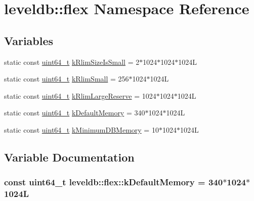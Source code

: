 \hypertarget{namespaceleveldb_1_1flex}{}\section{leveldb\+:\+:flex Namespace Reference}
\label{namespaceleveldb_1_1flex}
\subsection*{Variables}
\begin{DoxyCompactItemize}
\item 
static const \hyperlink{stdint_8h_aaa5d1cd013383c889537491c3cfd9aad}{uint64\+\_\+t} \hyperlink{namespaceleveldb_1_1flex_af09b08660faa7ab237dcb9aa82bc5bab}{k\+Rlim\+Size\+Is\+Small} = 2$\ast$1024$\ast$1024$\ast$1024\+L
\item 
static const \hyperlink{stdint_8h_aaa5d1cd013383c889537491c3cfd9aad}{uint64\+\_\+t} \hyperlink{namespaceleveldb_1_1flex_a5fe4e3d0496afe8a7e9902a7819ec9fa}{k\+Rlim\+Small} = 256$\ast$1024$\ast$1024\+L
\item 
static const \hyperlink{stdint_8h_aaa5d1cd013383c889537491c3cfd9aad}{uint64\+\_\+t} \hyperlink{namespaceleveldb_1_1flex_aa93b23239803953fdb50d685ae6c07cc}{k\+Rlim\+Large\+Reserve} = 1024$\ast$1024$\ast$1024\+L
\item 
static const \hyperlink{stdint_8h_aaa5d1cd013383c889537491c3cfd9aad}{uint64\+\_\+t} \hyperlink{namespaceleveldb_1_1flex_a300deb1bb8fec8c95157943a943ce7a1}{k\+Default\+Memory} = 340$\ast$1024$\ast$1024\+L
\item 
static const \hyperlink{stdint_8h_aaa5d1cd013383c889537491c3cfd9aad}{uint64\+\_\+t} \hyperlink{namespaceleveldb_1_1flex_abf27c14156b752e9b1f40910e02650a9}{k\+Minimum\+D\+B\+Memory} = 10$\ast$1024$\ast$1024\+L
\end{DoxyCompactItemize}


\subsection{Variable Documentation}
\hypertarget{namespaceleveldb_1_1flex_a300deb1bb8fec8c95157943a943ce7a1}{}
\subsubsection[{k\+Default\+Memory}]{\setlength{\rightskip}{0pt plus 5cm}const {\bf uint64\+\_\+t} leveldb\+::flex\+::k\+Default\+Memory = 340$\ast$1024$\ast$1024\+L\hspace{0.3cm}{\ttfamily [static]}}\label{namespaceleveldb_1_1flex_a300deb1bb8fec8c95157943a943ce7a1}
\hypertarget{namespaceleveldb_1_1flex_abf27c14156b752e9b1f40910e02650a9}{}
